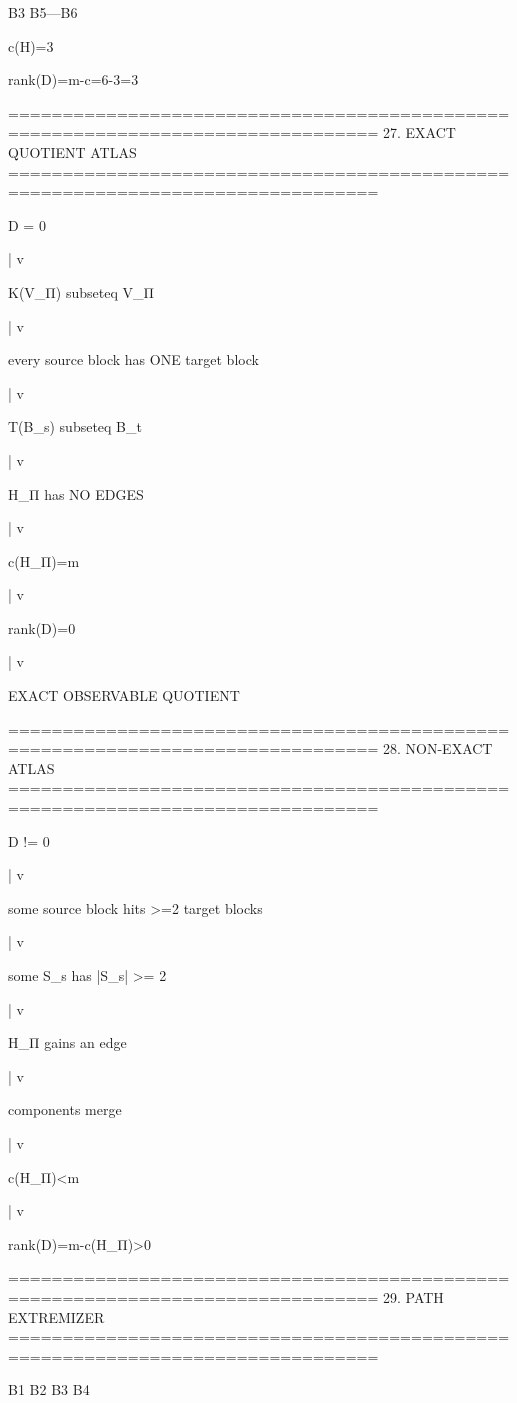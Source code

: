        B3                 B5---B6

       c(H)=3

       rank(D)=m-c=6-3=3

================================================================================
27. EXACT QUOTIENT ATLAS
================================================================================

D = 0

       |
       v

K(V_Π) subseteq V_Π

       |
       v

every source block has ONE target block

       |
       v

T(B_s) subseteq B_t

       |
       v

H_Π has NO EDGES

       |
       v

c(H_Π)=m

       |
       v

rank(D)=0

       |
       v

EXACT OBSERVABLE QUOTIENT

================================================================================
28. NON-EXACT ATLAS
================================================================================

D != 0

       |
       v

some source block hits >=2 target blocks

       |
       v

some S_s has |S_s| >= 2

       |
       v

H_Π gains an edge

       |
       v

components merge

       |
       v

c(H_Π)<m

       |
       v

rank(D)=m-c(H_Π)>0

================================================================================
29. PATH EXTREMIZER
================================================================================

B1       B2       B3       B4

